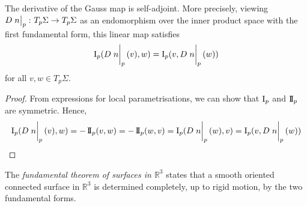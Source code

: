 \begin{lemma}
	The derivative of the Gauss map is self-adjoint.
	More precisely, viewing \( D \eval{n}_p \colon T_p \Sigma \to T_p \Sigma \) as an endomorphism over the inner product space with the first fundamental form, this linear map satisfies
	\[
		\Iff_p(D \eval{n}_p(v), w) = \Iff_p(v, D \eval{n}_p(w))
	\]
	for all \( v, w \in T_p \Sigma \).
\end{lemma}
\begin{proof}
	From expressions for local parametrisations, we can show that \( \operatorname{\mathrm{I}}_p \) and \( \operatorname{\mathrm{I\!I}}_p \) are symmetric.
	Hence,
	\[
		\Iff_p(D\eval{n}_p(v),w) = -\IIff_p(v,w) = -\IIff_p(w,v) = \Iff_p(D \eval{n}_p(w),v) = \Iff_p(v,D\eval{n}_p(w))
	\]
\end{proof}
\begin{remark}
	The \textit{fundamental theorem of surfaces in \( \mathbb R^3 \)} states that a smooth oriented connected surface in \( \mathbb R^3 \) is determined completely, up to rigid motion, by the two fundamental forms.
\end{remark}

